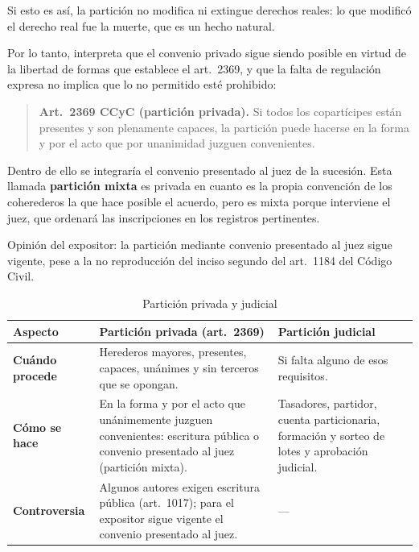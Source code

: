 \documentclass[12pt,oneside]{book}
\begin{document}
\begin{important}
Si esto es así, la partición no modifica ni extingue derechos reales: lo que modificó el derecho real fue la muerte, que es un hecho natural.
\end{important}

Por lo tanto, interpreta que el convenio privado sigue siendo posible en virtud de la libertad de formas que establece el art.~2369, y que la falta de regulación expresa no implica que lo no permitido esté prohibido:

\begin{quote}
\textbf{Art.~2369 CCyC (partición privada).} Si todos los copartícipes están presentes y son plenamente capaces, la partición puede hacerse en la forma y por el acto que por unanimidad juzguen convenientes.
\end{quote}

Dentro de ello se integraría el convenio presentado al juez de la sucesión. Esta llamada \textbf{partición mixta} es privada en cuanto es la propia convención de los coherederos la que hace posible el acuerdo, pero es mixta porque interviene el juez, que ordenará las inscripciones en los registros pertinentes.

\begin{important}
Opinión del expositor: la partición mediante convenio presentado al juez sigue vigente, pese a la no reproducción del inciso segundo del art.~1184 del Código Civil.
\end{important}

\begin{table}[H]
\centering
\caption{Partición privada y judicial}
\small
\begin{tabularx}{\textwidth}{@{}>{\raggedright\arraybackslash}p{2.6cm}>{\raggedright\arraybackslash}X>{\raggedright\arraybackslash}X@{}}
\toprule
\textbf{Aspecto} & \textbf{Partición privada (art.~2369)} & \textbf{Partición judicial} \\
\midrule
\textbf{Cuándo procede} & Herederos mayores, presentes, capaces, unánimes y sin terceros que se opongan. & Si falta alguno de esos requisitos. \\
\textbf{Cómo se hace} & En la forma y por el acto que unánimemente juzguen convenientes: escritura pública o convenio presentado al juez (partición mixta). & Tasadores, partidor, cuenta particionaria, formación y sorteo de lotes y aprobación judicial. \\
\textbf{Controversia} & Algunos autores exigen escritura pública (art.~1017); para el expositor sigue vigente el convenio presentado al juez. & --- \\
\bottomrule
\end{tabularx}
\end{table}
\end{document}
